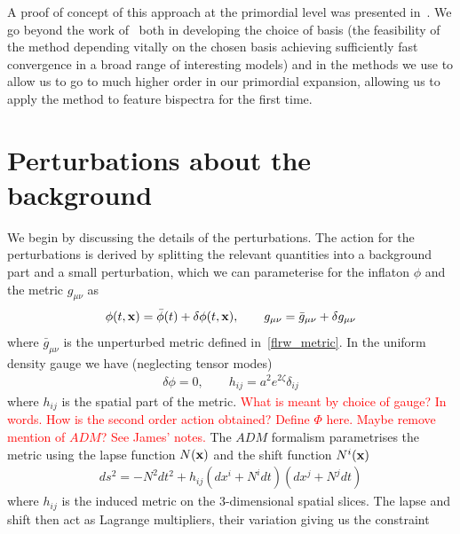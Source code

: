 A proof of concept of this approach at the primordial level was presented in~\cite{Funakoshi}.
We go beyond the work of~\cite{Funakoshi} both in developing the choice of basis
(the feasibility of the method depending vitally on the chosen basis
achieving sufficiently fast convergence in a broad range of interesting models)
and in the methods we use to allow us to go to much higher order in our primordial expansion,
allowing us to apply the method to feature bispectra for the first time.


\section{Perturbations about the background}
    We begin by discussing the details of the perturbations.
    The action for the perturbations is derived by
    splitting the relevant quantities into a background
    part and a small perturbation, which we can parameterise
    for the inflaton $\phi$ and the metric $g_{\mu\nu}$ as
    \begin{align}
        \phi(t,\mathbf{x})=\bar{\phi}(t)+\delta\phi(t,\mathbf{x}), \qquad g_{\mu\nu}=\bar{g}_{\mu\nu}+\delta g_{\mu\nu}
    \end{align}
    where $\bar{g}_{\mu\nu}$ is the unperturbed metric defined in~\eqref{flrw_metric}.
    In the uniform density gauge we have (neglecting tensor modes)
    \begin{align}
        \delta \phi=0, \qquad h_{ij}=a^2 e^{2\zeta} \delta_{ij}
    \end{align}
    where $h_{ij}$ is the spatial part of the metric.
    \textcolor{red}{What is meant by choice of gauge? In words. How is the
    second order action obtained?}
    \textcolor{red}{Define $\Phi$ here. Maybe remove mention of $ADM$? See James' notes.}
    The $ADM$ formalism parametrises the metric using the lapse function $N(\mathbf{x})$
    and the shift function $N^i(\mathbf{x})$
    \begin{align}\label{adm_metric}
        ds^2 = -N^2dt^2+h_{ij}\left(dx^i+N^idt\right)\left(dx^j+N^jdt\right)
    \end{align}
    where $h_{ij}$ is the induced metric on the 3-dimensional spatial slices.
    The lapse and shift then act as Lagrange multipliers, their variation giving us the constraint
